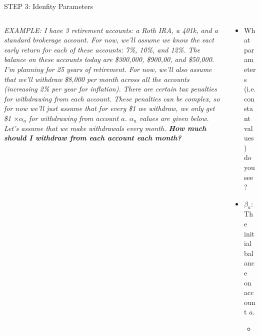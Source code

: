 \documentclass[10pt, aspectratio=169]{beamer}
\newcommand{\retirementProblem}{\textit{EXAMPLE: I have 3 retirement accounts: a Roth IRA, a 401k, and a standard brokerage account. For now, we'll assume we know the eact early return for each of these accounts: 7\%, 10\%, and 12\%. The balance on these accounts today are \$300,000, \$900,00, and \$50,000. I'm planning for 25 years of retirement. For now, we'll also assume that we'll withdraw \$8,000 per month across all the accounts (increasing 2\% per year for inflation). There are certain tax penalties for withdrawing from each account. These penalties can be complex, so for now we'll just assume that for every \$1 we withdraw, we only get \$1 $\times \alpha_a$ for withdrawing from account $a$. $\alpha_a$ values are given below. Let's assume that we make withdrawals every month. \textbf{How much should I withdraw from each account each month?}}}
\begin{document}
\begin{frame}{STEP 3: Idenfity Parameters}
    \begin{columns}
        \begin{column}{0.5\textwidth}
            \retirementProblem
        \end{column}
        \begin{column}{0.5\textwidth}
            \begin{itemize}
                \item What parameters (i.e. constant values) do you see?
                \pause
                \item $\beta_a$: The initial balance on account $a$.
                \begin{itemize}
                    \item I like $\beta$ since it looks like $B$ which is the variable most related to this parameter.
                \end{itemize}
                \item $\delta_a$: The (monthly?) interest rate for account $a$.
                \item $\omega_t$: The amount of money I'll need to withdraw in month $t$
                \begin{itemize}
                    \item Remember, this depends on the month ($t$) since it changes with inflation.
                \end{itemize}
                \item $\alpha_a$: The fraction of money withdrawn from account $a$ that I get to keep.
            \end{itemize}
        \end{column}
    \end{columns}
\end{frame}
\end{document}

